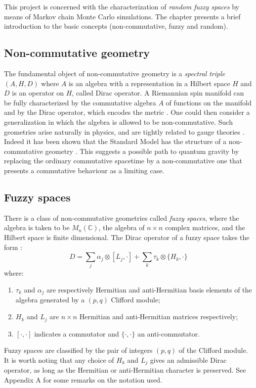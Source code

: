 This project is concerned with the characterization of \emph{random fuzzy spaces} by means of Markov chain Monte Carlo simulations. The chapter presents a brief introduction to the basic concepts (non-commutative, fuzzy and random).

\subsection{Non-commutative geometry} \label{sec:ncg}
The fundamental object of non-commutative geometry is a \emph{spectral triple} $(A, H, D)$ where $A$ is an algebra with a representation in a Hilbert space $H$ and $D$ is an operator on $H$, called Dirac operator. A Riemannian spin manifold can be fully characterized by the commutative algebra $A$ of functions on the manifold and by the Dirac operator, which encodes the metric \cite{connesRECON}. One could then consider a generalization in which the algebra is allowed to be non-commutative. Such geometries arise naturally in physics, and are tightly related to gauge theories \cite{suijlekom}. Indeed it has been shown that the Standard Model has the structure of a non-commutative geometry \cite{barrettLOR} \cite{connesSAP} \cite{connesNEUT} \cite{connesGRAVMAT}. This suggests a possible path to quantum gravity by replacing the ordinary commutative spacetime by a non-commutative one that presents a commutative behaviour as a limiting case.

\subsection{Fuzzy spaces} \label{sec:fuzzy}
There is a class of non-commutative geometries called \emph{fuzzy spaces}, where the algebra is taken to be $M_n(\mathbb{C})$, the algebra of $n \times n$ complex matrices, and the Hilbert space is finite dimensional. The Dirac operator of a fuzzy space takes the form \cite{barrett}:
\begin{equation}\label{eq:dirac_bad}
D = \sum_j \alpha_j \otimes [L_j, \cdot ] + \sum_k \tau_k \otimes \{H_k, \cdot \}
\end{equation}
where:
\begin{enumerate}
\item  $\tau_k$ and $\alpha_j$ are respectively Hermitian and anti-Hermitian basis elements of the algebra generated by a $(p, q)$ Clifford module;
\item $H_k$ and $L_j$ are $n \times n$ Hermitian and anti-Hermitian matrices respectively;
\item $[\cdot , \cdot]$ indicates a commutator and $\{ \cdot , \cdot \}$ an anti-commutator.  
\end{enumerate}
Fuzzy spaces are classified by the pair of integers $(p, q)$ of the Clifford module. It is worth noting that any choice of $H_k$ and $L_j$ gives an admissible Dirac operator, as long as the Hermitian or anti-Hermitian character is preserved.\newline
See Appendix A for some remarks on the notation used.

